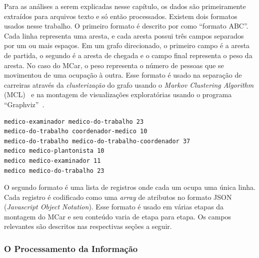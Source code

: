 \documentclass[12pt,a4paper]{article}
\theoremstyle{hypo}
\begin{document}

Para as análises a serem explicadas nesse capítulo, os dados são primeiramente extraídos para arquivos texto e só então processados. Existem dois formatos usados nesse trabalho. O primeiro formato é descrito por  como \enquote{formato ABC}. Cada linha representa uma aresta, e cada aresta possui três campos separados por um ou mais espaços. Em um grafo direcionado, o primeiro campo é a aresta de partida, o segundo é a aresta de chegada e o campo final representa o peso da aresta. No caso do MCar, o peso representa o número de pessoas que se movimentou de uma ocupação à outra. Esse formato é usado na separação de carreiras através da \textit{clusterização} do grafo usando o \textit{Markov Clustering Algorithm} (MCL)~\cite{Van_Dongen2000-qm} e na montagem de visualizações exploratórias usando o programa \enquote{Graphviz}~\cite{Gansner2000-oo}.

\noindent\begin{minipage}{\linewidth}
\begin{lstlisting}[frame=single,caption=Arquivo em Formato ABC,label=lst:formato-abc,captionpos=b]
medico-examinador medico-do-trabalho 23
medico-do-trabalho coordenador-medico 10
medico-do-trabalho medico-do-trabalho-coordenador 37
medico medico-plantonista 10
medico medico-examinador 11
medico medico-do-trabalho 23
\end{lstlisting}
\end{minipage}

O segundo formato é uma lista de registros onde cada um ocupa uma única linha. Cada registro é codificado como uma \textit{array} de atributos no formato JSON (\textit{Javascript Object Notation}). Esse formato é usado em várias etapas da montagem do MCar e seu conteúdo varia de etapa para etapa. Os campos relevantes são descritos nas respectivas seções a seguir.

\subsubsection{O Processamento da Informação}
\end{document}
